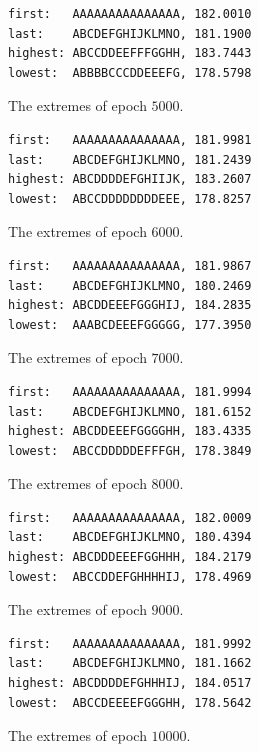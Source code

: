 \documentclass[a4paper, 10pt, notitlepage, twocolumn]{article}
\begin{document}
\begin{figure}[!ht]
 \begin{verbatim}
first:   AAAAAAAAAAAAAAA, 182.0010
last:    ABCDEFGHIJKLMNO, 181.1900
highest: ABCCDDEEFFFGGHH, 183.7443
lowest:  ABBBBCCCDDEEEFG, 178.5798
 \end{verbatim}
 \vspace{-20pt} 
 \caption{The extremes of epoch $5000$.}
\end{figure}


\begin{figure}[!ht]
 \begin{verbatim}
first:   AAAAAAAAAAAAAAA, 181.9981
last:    ABCDEFGHIJKLMNO, 181.2439
highest: ABCDDDDEFGHIIJK, 183.2607
lowest:  ABCCDDDDDDDDEEE, 178.8257
 \end{verbatim}
 \vspace{-20pt} 
 \caption{The extremes of epoch $6000$.}
\end{figure}


\begin{figure}[!ht]
 \begin{verbatim}
first:   AAAAAAAAAAAAAAA, 181.9867
last:    ABCDEFGHIJKLMNO, 180.2469
highest: ABCDDEEEFGGGHIJ, 184.2835
lowest:  AAABCDEEEFGGGGG, 177.3950
 \end{verbatim}
 \vspace{-20pt} 
 \caption{The extremes of epoch $7000$.}
\end{figure}


\begin{figure}[!ht]
 \begin{verbatim}
first:   AAAAAAAAAAAAAAA, 181.9994
last:    ABCDEFGHIJKLMNO, 181.6152
highest: ABCDDEEEFGGGGHH, 183.4335
lowest:  ABCCDDDDDEFFFGH, 178.3849
 \end{verbatim}
 \vspace{-20pt} 
 \caption{The extremes of epoch $8000$.}
\end{figure}


\begin{figure}[!ht]
 \begin{verbatim}
first:   AAAAAAAAAAAAAAA, 182.0009
last:    ABCDEFGHIJKLMNO, 180.4394
highest: ABCDDDEEEFGGHHH, 184.2179
lowest:  ABCCDDEFGHHHHIJ, 178.4969
 \end{verbatim}
 \vspace{-20pt} 
 \caption{The extremes of epoch $9000$.}
\end{figure}

\begin{figure}[!ht]
 \begin{verbatim}
first:   AAAAAAAAAAAAAAA, 181.9992
last:    ABCDEFGHIJKLMNO, 181.1662
highest: ABCDDDDEFGHHHIJ, 184.0517
lowest:  ABCCDEEEEFGGGHH, 178.5642
 \end{verbatim}
 \vspace{-20pt} 
 \caption{The extremes of epoch $10000$.}
\end{figure}
\end{document}
